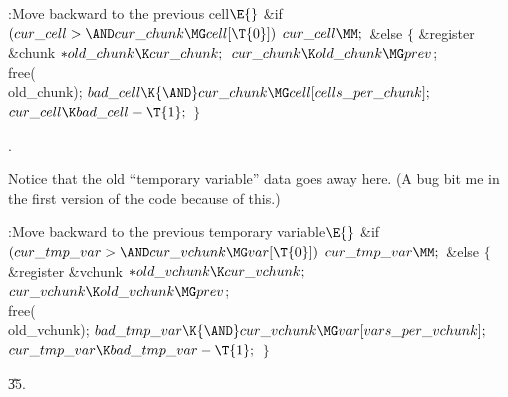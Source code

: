 \B{}:Move  backward to the previous cell\X${}\E{}$\6
\&{if} ${}(\\{cur\_cell}>{\AND}\\{cur\_chunk}\MG\\{cell}[\T{0}]){}$\1\5
${}\\{cur\_cell}\MM;{}$\2\6
\&{else}\5
${}\{{}$\1\6
\&{register} \&{chunk} ${}{*}\\{old\_chunk}\K\\{cur\_chunk};{}$\7
${}\\{cur\_chunk}\K\\{old\_chunk}\MG\\{prev}{}$;\5
\\{free}(\\{old\_chunk});\6
${}\\{bad\_cell}\K{\AND}\\{cur\_chunk}\MG\\{cell}[\\{cells\_per\_chunk}];{}$\6
${}\\{cur\_cell}\K\\{bad\_cell}-\T{1};{}$\6
\4${}\}{}$\2\par
{}.\fi

Notice that the old ``temporary variable'' data goes away here.
(A bug bit me in the first version of the code because of this.)

\Y\B\4:Move  backward to the previous temporary
variable\X${}\E{}$\6
\&{if} ${}(\\{cur\_tmp\_var}>{\AND}\\{cur\_vchunk}\MG\\{var}[\T{0}]){}$\1\5
${}\\{cur\_tmp\_var}\MM;{}$\2\6
\&{else}\5
${}\{{}$\1\6
\&{register} \&{vchunk} ${}{*}\\{old\_vchunk}\K\\{cur\_vchunk};{}$\7
${}\\{cur\_vchunk}\K\\{old\_vchunk}\MG\\{prev}{}$;\5
\\{free}(\\{old\_vchunk});\6
${}\\{bad\_tmp\_var}\K{\AND}\\{cur\_vchunk}\MG\\{var}[\\{vars\_per%
\_vchunk}];{}$\6
${}\\{cur\_tmp\_var}\K\\{bad\_tmp\_var}-\T{1};{}$\6
\4${}\}{}$\2\par
\U35.\fi

